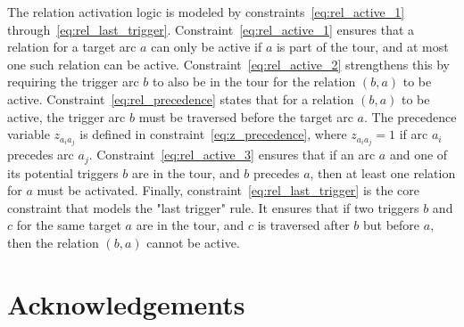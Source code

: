 \documentclass[twocolumn, switch]{article} %
\begin{document}
The relation activation logic is modeled by constraints~\eqref{eq:rel_active_1} through~\eqref{eq:rel_last_trigger}.
Constraint~\eqref{eq:rel_active_1} ensures that a relation for a target arc $a$ can only be active if $a$ is part of the tour, and at most one such relation can be active.
Constraint~\eqref{eq:rel_active_2} strengthens this by requiring the trigger arc $b$ to also be in the tour for the relation $(b,a)$ to be active.
Constraint~\eqref{eq:rel_precedence} states that for a relation $(b,a)$ to be active, the trigger arc $b$ must be traversed before the target arc $a$.
The precedence variable $z_{a_ia_j}$ is defined in constraint~\eqref{eq:z_precedence}, where $z_{a_ia_j}=1$ if arc $a_i$ precedes arc $a_j$.
Constraint~\eqref{eq:rel_active_3} ensures that if an arc $a$ and one of its potential triggers $b$ are in the tour, and $b$ precedes $a$, then at least one relation for $a$ must be activated.
Finally, constraint~\eqref{eq:rel_last_trigger} is the core constraint that models the "last trigger" rule. It ensures that if two triggers $b$ and $c$ for the same target $a$ are in the tour, and $c$ is traversed after $b$ but before $a$, then the relation $(b,a)$ cannot be active.


\footnotesize
\section*{Acknowledgements}

\normalsize



\end{document}
